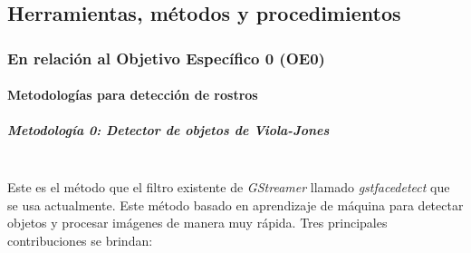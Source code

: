 \documentclass[a4paper,openright,12pt]{report}
\begin{document}
\subsection{Herramientas, métodos y procedimientos}

\subsubsection{En relación al Objetivo Específico 0 (OE0)}

\paragraph{Metodologías para detección de rostros}
\subparagraph{Metodología 0: Detector de objetos de Viola-Jones}\mbox{} \\
Este es el método que el filtro existente de \textit{GStreamer} llamado
\textit{gstfacedetect} que se usa actualmente. Este método basado en aprendizaje
de máquina para detectar objetos y procesar imágenes de manera muy rápida. Tres
principales contribuciones se brindan:
\end{document}

